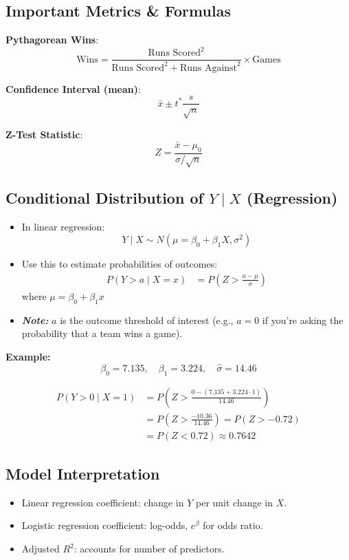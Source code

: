 \documentclass[10pt, landscape]{article}
\begin{document}
\begin{multicols}{3}
\subsection{Important Metrics \& Formulas}

\textbf{Pythagorean Wins}:
\[
\text{Wins} = \frac{\text{Runs Scored}^2}{\text{Runs Scored}^2 + \text{Runs Against}^2} \times \text{Games} 
\]

\textbf{Confidence Interval (mean)}:
\[
\bar{x} \pm t^*\frac{s}{\sqrt{n}}
\]

\textbf{Z-Test Statistic}:
\[
Z = \frac{\bar{x} - \mu_0}{\sigma/\sqrt{n}}
\]

\subsection*{Conditional Distribution of $Y \mid X$ (Regression)}

\begin{itemize}[noitemsep]
    \item In linear regression:  
    \[
    Y \mid X \sim N(\mu = \beta_0 + \beta_1 X, \sigma^2)
    \]
    
    \item Use this to estimate probabilities of outcomes:
    \begin{align*}
    P(Y > a \mid X = x) 
    &= P\left(Z > \frac{a - \mu}{\sigma}\right)
    \end{align*}
    where \( \mu = \beta_0 + \beta_1 x \)

    \item \textit{\textbf{Note:}} \( a \) is the outcome threshold of interest  
    (e.g., \( a = 0 \) if you're asking the probability that a team wins a game).
\end{itemize}

\textbf{Example:}
\[
\beta_0 = 7.135, \quad 
\beta_1 = 3.224, \quad 
\hat{\sigma} = 14.46
\]

\begin{align*}
P(Y > 0 \mid X = 1) 
&= P\left(Z > \frac{0 - (7.135 + 3.224 \cdot 1)}{14.46} \right) \\
&= P\left(Z > \frac{-10.36}{14.46} \right) = P(Z > -0.72) \\
&= P(Z < 0.72) \approx 0.7642
\end{align*}



\subsection{Model Interpretation}
\begin{itemize}[noitemsep]
    \item Linear regression coefficient: change in \(Y\) per unit change in \(X\).
    \item Logistic regression coefficient: log-odds, \(e^\beta\) for odds ratio.
    \item Adjusted \(R^2\): accounts for number of predictors.
\end{itemize}


\end{multicols}
\end{document}
